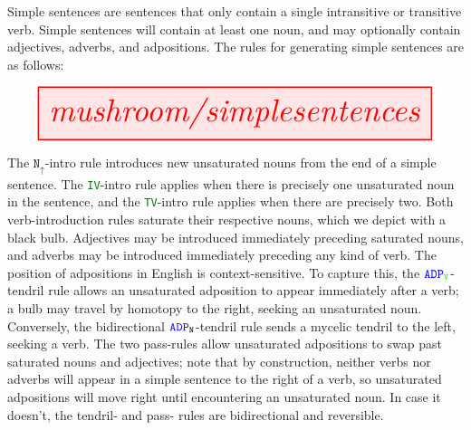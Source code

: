 

Simple sentences are sentences that only contain a single intransitive or transitive verb. Simple sentences will contain at least one noun, and may optionally contain adjectives, adverbs, and adpositions. The rules for generating simple sentences are as follows:

\[
\resizebox{\textwidth}{!}{\tikzfig{mushroom/simplesentences}}
\]

The $\texttt{N}_\uparrow$-intro rule introduces new unsaturated nouns from the end of a simple sentence. The \textcolor{green}{\texttt{IV}}-intro rule applies when there is precisely one unsaturated noun in the sentence, and the \textcolor{green}{\texttt{TV}}-intro rule applies when there are precisely two. Both verb-introduction rules saturate their respective nouns, which we depict with a black bulb. Adjectives may be introduced immediately preceding saturated nouns, and adverbs may be introduced immediately preceding any kind of verb. The position of adpositions in English is context-sensitive. To capture this, the $\textcolor{blue}{\texttt{ADP}}_{\textcolor{green}{\texttt{V}}}$-tendril rule allows an unsaturated adposition to appear immediately after a verb; a bulb may travel by homotopy to the right, seeking an unsaturated noun. Conversely, the bidirectional $\textcolor{blue}{\texttt{ADP}}_{\texttt{N}}$-tendril rule sends a mycelic tendril to the left, seeking a verb. The two pass-rules allow unsaturated adpositions to swap past saturated nouns and adjectives; note that by construction, neither verbs nor adverbs will appear in a simple sentence to the right of a verb, so unsaturated adpositions will move right until encountering an unsaturated noun. In case it doesn't, the tendril- and pass- rules are bidirectional and reversible.

